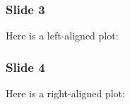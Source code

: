 \documentclass[t,english]{beamer}
\begin{document}
\begin{frame}[fragile]
\frametitle{Slide 3}


Here is a left-aligned plot:

\end{frame}

\begin{frame}[fragile]
\frametitle{Slide 4}


Here is a right-aligned plot:

\end{frame}
\end{document}
